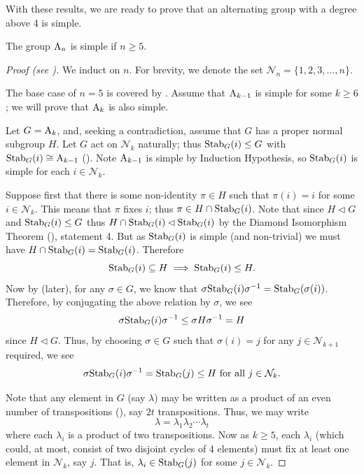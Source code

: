 With these results, we are ready to prove that an alternating group with a degree above 4 is simple.
\begin{theorem}\label{thrm-An-is-simple-for-n>=5}
    The group $\mathrm{A}_{n}$ is simple if $n \geq 5$.
\end{theorem}
\begin{proof}[Proof (see {\cite[pp.~149--150, Theorem 24]{dummit_foote_2004}})]
    We induct on $n$. For brevity, we denote the set $\mathcal{N}_n = \{1, 2, 3, \dots, n\}$.
    
    The base case of $n = 5$ is covered by . Assume that $\mathrm{A}_{k-1}$ is simple for some $k \geq 6$; we will prove that $\mathrm{A}_{k}$ is also simple.

    Let $G = \mathrm{A}_{k}$, and, seeking a contradiction, assume that $G$ has a proper normal subgroup $H$. Let $G$ act on $\mathcal{N}_{k}$ naturally; thus $\mathrm{Stab}_{G}(i) \leq G$ with $\mathrm{Stab}_{G}(i) \cong \mathrm{A}_{k-1}$ (). Note $\mathrm{A}_{k-1}$ is simple by Induction Hypothesis, so $\mathrm{Stab}_{G}(i)$ is simple for each $i \in \mathcal{N}_{k}$.

    Suppose first that there is some non-identity $\pi \in H$ such that $\pi(i) = i$ for some $i \in \mathcal{N}_{k}$. This means that $\pi$ fixes $i$; thus $\pi \in H \cap \mathrm{Stab}_{G}(i)$. Note that since $H \lhd G$ and $\mathrm{Stab}_{G}(i) \leq G$ thus $H \cap \mathrm{Stab}_{G}(i) \lhd \mathrm{Stab}_{G}(i)$ by the Diamond Isomorphism Theorem (), statement 4. But as $\mathrm{Stab}_{G}(i)$ is simple (and non-trivial) we must have $H \cap \mathrm{Stab}_{G}(i) = \mathrm{Stab}_{G}(i)$. Therefore
    \[
        \mathrm{Stab}_{G}(i) \subseteq H \implies \mathrm{Stab}_{G}(i) \leq H.
    \]
    Now by  (later), for any $\sigma \in G$, we know that $\sigma\mathrm{Stab}_{G}(i)\sigma^{-1} = \mathrm{Stab}_{G}(\sigma(i))$. Therefore, by conjugating the above relation by $\sigma$, we see
    \[
        \sigma\mathrm{Stab}_{G}(i)\sigma^{-1} \leq \sigma H\sigma^{-1} = H
    \]
    since $H \lhd G$. Thus, by choosing $\sigma \in G$ such that $\sigma(i) = j$ for any $j \in \mathcal{N}_{k+1}$ required, we see
    \[
        \sigma\mathrm{Stab}_{G}(i)\sigma^{-1} = \mathrm{Stab}_{G}(j) \leq H \text{ for all } j \in \mathcal{N}_{k}.
    \]
    
    Note that any element in $G$ (say $\lambda$) may be written as a product of an even number of transpositions (), say $2t$ transpositions. Thus, we may write
    \[
        \lambda = \lambda_1\lambda_2\cdots\lambda_t
    \]
    where each $\lambda_i$ is a product of two transpositions. Now as $k \geq 5$, each $\lambda_i$ (which could, at most, consist of two disjoint cycles of 4 elements) must fix at least one element in $\mathcal{N}_{k}$, say $j$. That is, $\lambda_i \in \mathrm{Stab}_{G}(j)$ for some $j \in \mathcal{N}_{k}$.
    

\end{proof}
